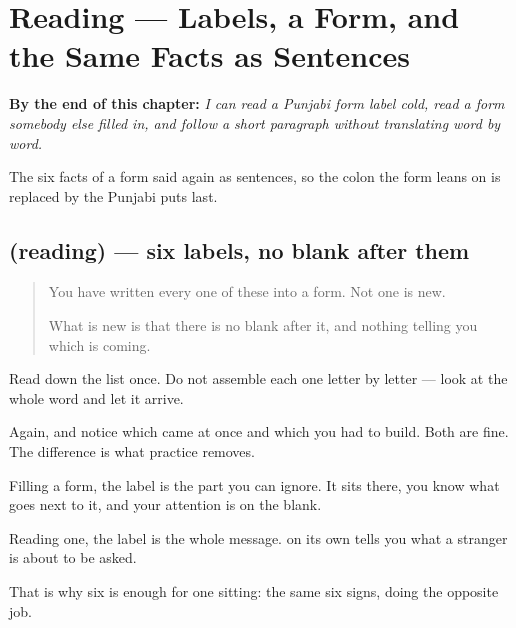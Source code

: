 
\chapter{Reading — Labels, a Form, and the Same Facts as Sentences}
\label{ch:pa-pehla-paath}

\begin{chapteropening}
\textbf{By the end of this chapter:} \emph{I can read a Punjabi form label cold, read a form somebody else filled in, and follow a short paragraph without translating word by word.}

The six facts of a form said again as sentences, so the colon the form leans on is replaced by the  Punjabi puts last.
\end{chapteropening}

\section[(reading)]{(reading) — six labels, no blank after them}

\label{lesson:PA-C45-labels}



\begin{quote}
You have written every one of these into a form. Not one is new.

What is new is that there is no blank after it, and nothing telling you which is coming.
\end{quote}

\begin{tcolorbox}[breakable,skin=enhanced,colback=orange!6,colframe=orange!45!black,boxrule=0.5pt,arc=1mm,left=6pt,right=6pt,top=4pt,bottom=4pt,fonttitle=\bfseries,title={Read this}]
\begin{quote}
     
\end{quote}

Read down the list once. Do not assemble each one letter by letter — look at the whole word and let it arrive.

Again, and notice which came at once and which you had to build. Both are fine. The difference is what practice removes.
\end{tcolorbox}

\begin{grammarlens}[title={What you've built}]
Filling a form, the label is the part you can ignore. It sits there, you know what goes next to it, and your attention is on the blank.

Reading one, the label is the whole message. \textbf{} on its own tells you what a stranger is about to be asked.

That is why six is enough for one sitting: the same six signs, doing the opposite job.
\end{grammarlens}


